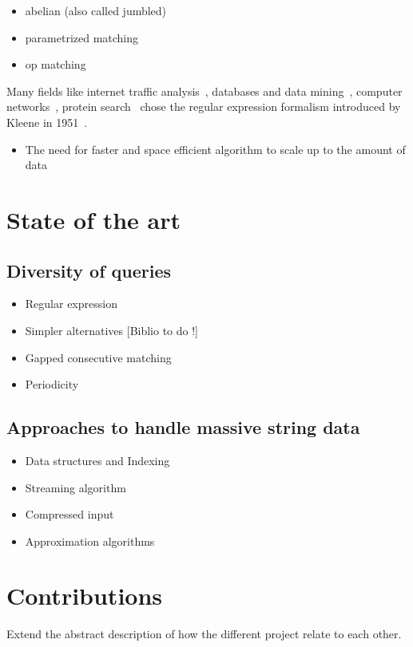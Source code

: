 \begin{itemize}
    \item abelian (also called jumbled)
    \item parametrized matching
    \item op matching
\end{itemize}

Many fields like internet traffic analysis~\cite{4221791,4579527}, databases and data mining~\cite{1000341,10.5555/645927.672035,10.1145/375551.375569}, computer networks~\cite{10.1145/1159913.1159952}, protein search~\cite{10.1145/369133.369220} chose the regular expression formalism introduced by Kleene in 1951~\cite{RM-704}.



\begin{itemize}
\item The need for faster and space efficient algorithm to scale up to the amount of data
\end{itemize}

\section{State of the art}

\subsection{Diversity of queries}
\begin{itemize}
\item Regular expression
\item Simpler alternatives [Biblio to do !]
\item Gapped consecutive matching
\item Periodicity
\end{itemize}

\subsection{Approaches to handle massive string data}

\begin{itemize}
\item Data structures and Indexing
\item Streaming algorithm
\item Compressed input
\item Approximation algorithms
\end{itemize}

\section{Contributions}

Extend the abstract description of how the different project relate to each other.
